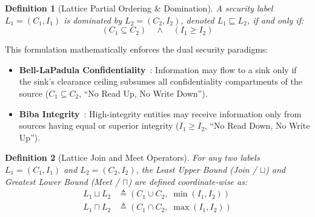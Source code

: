 \documentclass[conference,10pt]{IEEEtran}
\newtheorem{definition}{Definition}
\begin{document}
\begin{definition}[Lattice Partial Ordering \& Domination]
A security label $L_1 = (C_1, I_1)$ is dominated by $L_2 = (C_2, I_2)$, denoted $L_1 \sqsubseteq L_2$, if and only if:
\begin{equation}
(C_1 \subseteq C_2) \quad \land \quad (I_1 \ge I_2)
\end{equation}
\end{definition}
This formulation mathematically enforces the dual security paradigms:
\begin{itemize}
    \item \textbf{Bell-LaPadula Confidentiality}~\cite{bell1973secure}: Information may flow to a sink only if the sink's clearance ceiling subsumes all confidentiality compartments of the source ($C_1 \subseteq C_2$, ``No Read Up, No Write Down'').
    \item \textbf{Biba Integrity}~\cite{biba1977integrity}: High-integrity entities may receive information only from sources having equal or superior integrity ($I_1 \ge I_2$, ``No Read Down, No Write Up'').
\end{itemize}

\begin{definition}[Lattice Join and Meet Operators]
For any two labels $L_1 = (C_1, I_1)$ and $L_2 = (C_2, I_2)$, the Least Upper Bound (Join / $\sqcup$) and Greatest Lower Bound (Meet / $\sqcap$) are defined coordinate-wise as:
\begin{align}
L_1 \sqcup L_2 &\triangleq (C_1 \cup C_2, \; \min(I_1, I_2)) \\
L_1 \sqcap L_2 &\triangleq (C_1 \cap C_2, \; \max(I_1, I_2))
\end{align}
\end{definition}
\end{document}
